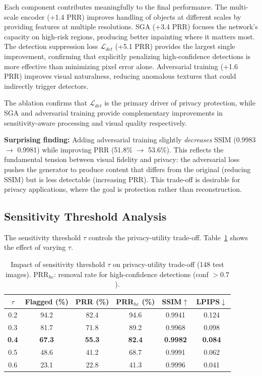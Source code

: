 \documentclass[preprint,12pt]{elsarticle}
\begin{document}
Each component contributes meaningfully to the final performance. The multi-scale encoder (+1.4 PRR) improves handling of objects at different scales by providing features at multiple resolutions. SGA (+3.4 PRR) focuses the network's capacity on high-risk regions, producing better inpainting where it matters most. The detection suppression loss $\mathcal{L}_{det}$ (+5.1 PRR) provides the largest single improvement, confirming that explicitly penalizing high-confidence detections is more effective than minimizing pixel error alone. Adversarial training (+1.6 PRR) improves visual naturalness, reducing anomalous textures that could indirectly trigger detectors.

The ablation confirms that $\mathcal{L}_{det}$ is the primary driver of privacy protection, while SGA and adversarial training provide complementary improvements in sensitivity-aware processing and visual quality respectively.

\textbf{Surprising finding:} Adding adversarial training slightly \emph{decreases} SSIM (0.9983 $\to$ 0.9981) while improving PRR (51.8\% $\to$ 53.6\%). This reflects the fundamental tension between visual fidelity and privacy: the adversarial loss pushes the generator to produce content that differs from the original (reducing SSIM) but is less detectable (increasing PRR). This trade-off is desirable for privacy applications, where the goal is protection rather than reconstruction.

\subsection{Sensitivity Threshold Analysis}
\label{sec:sensitivity}

The sensitivity threshold $\tau$ controls the privacy-utility trade-off. Table~\ref{tab:threshold} shows the effect of varying $\tau$.

\begin{table}[t]
\centering
\caption{Impact of sensitivity threshold $\tau$ on privacy-utility trade-off (148 test images). PRR$_{hc}$: removal rate for high-confidence detections (conf $>0.7$).}
\label{tab:threshold}
\begin{tabular}{cccccc}
\toprule
$\tau$ & \textbf{Flagged (\%)} & \textbf{PRR (\%)} & \textbf{PRR$_{hc}$ (\%)} & \textbf{SSIM}$\uparrow$ & \textbf{LPIPS}$\downarrow$ \\
\midrule
0.2 & 94.2 & 82.4 & 94.6 & 0.9941 & 0.124 \\
0.3 & 81.7 & 71.8 & 89.2 & 0.9968 & 0.098 \\
\textbf{0.4} & \textbf{67.3} & \textbf{55.3} & \textbf{82.4} & \textbf{0.9982} & \textbf{0.084} \\
0.5 & 48.6 & 41.2 & 68.7 & 0.9991 & 0.062 \\
0.6 & 23.1 & 22.8 & 41.3 & 0.9996 & 0.041 \\
\bottomrule
\end{tabular}
\end{table}
\end{document}
